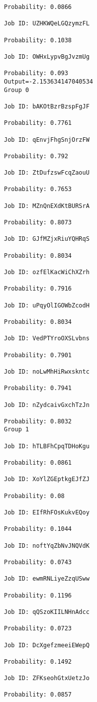 \documentclass[11pt]{article}
\begin{document}
\begin{Verbatim}[commandchars=\\\{\}]
Probability: 0.0866

Job ID: UZHKWQeLGQzymzFL

Probability: 0.1038

Job ID: OWHxLypvBgJvzmUg

Probability: 0.093
Output=-2.153634147040534
Group 0

Job ID: bAKOtBzrBzspFgJF

Probability: 0.7761

Job ID: qEnvjFhgSnjOrzFW

Probability: 0.792

Job ID: ZtDufzswFcqZaouU

Probability: 0.7653

Job ID: MZnQnEXdKtBURSrA

Probability: 0.8073

Job ID: GJfMZjxRiuYQHRqS

Probability: 0.8034

Job ID: ozfElKacWiChXZrh

Probability: 0.7916

Job ID: uPqyOlIGOWbZcodH

Probability: 0.8034

Job ID: VedPTYroOXSLvbns

Probability: 0.7901

Job ID: noLwMhHiRwxskntc

Probability: 0.7941

Job ID: nZydcaivGxchTzJn

Probability: 0.8032
Group 1

Job ID: hTLBFhCpqTDHoKgu

Probability: 0.0861

Job ID: XoYlZGEptkgEJfZJ

Probability: 0.08

Job ID: EIfRhFOsKukvEQoy

Probability: 0.1044

Job ID: noftYqZbNvJNQVdK

Probability: 0.0743

Job ID: ewmRNLiyeZzqUSww

Probability: 0.1196

Job ID: qQSzoKIILNHnAdcc

Probability: 0.0723

Job ID: DcXgefzmeeiEWepQ

Probability: 0.1492

Job ID: ZFKseohGtxUetzJo

Probability: 0.0857


\end{Verbatim}
\end{document}
